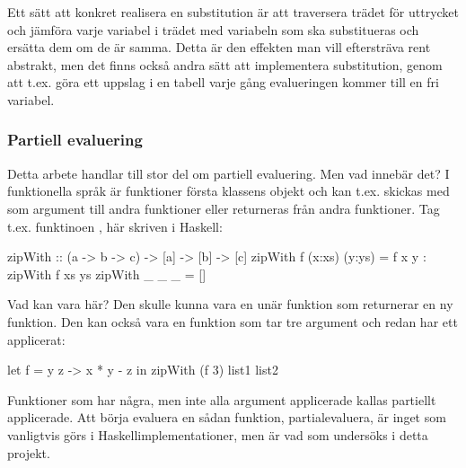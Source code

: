 \documentclass[Rapport]{subfiles}
\begin{document}
    Ett sätt att konkret realisera en substitution är att traversera trädet
för uttrycket och jämföra varje variabel i trädet med variabeln som ska substitueras och ersätta dem
om de är samma. Detta är den effekten man vill eftersträva rent abstrakt,
men det finns också andra sätt att implementera substitution, genom
att t.ex. göra ett uppslag i en tabell varje gång evalueringen kommer till en fri variabel. 

\subsubsection{Partiell evaluering}
Detta arbete handlar till stor del om partiell evaluering. Men vad innebär det?
I funktionella språk är funktioner första klassens objekt och kan t.ex.
skickas med som argument till andra funktioner eller returneras från
andra funktioner. Tag t.ex. funktinoen , här skriven i Haskell:

\begin{codeEx}
zipWith :: (a -> b -> c) -> [a] -> [b] -> [c]
zipWith f (x:xs) (y:ys) = f x y : zipWith f xs ys
zipWith _ _      _      = []
\end{codeEx}

Vad kan  vara här? Den skulle kunna vara en unär funktion som returnerar en ny
funktion. Den kan också vara en funktion som tar tre argument och redan har ett
applicerat:

\begin{codeEx}
let f = \x y z -> x * y - z
in  zipWith (f 3) list1 list2
\end{codeEx}


Funktioner som har några, men inte alla argument applicerade kallas 
partiellt applicerade. Att börja evaluera en sådan funktion, partialevaluera,
är inget som vanligtvis görs i Haskellimplementationer, 
men är vad som undersöks i detta projekt. 
\end{document}
